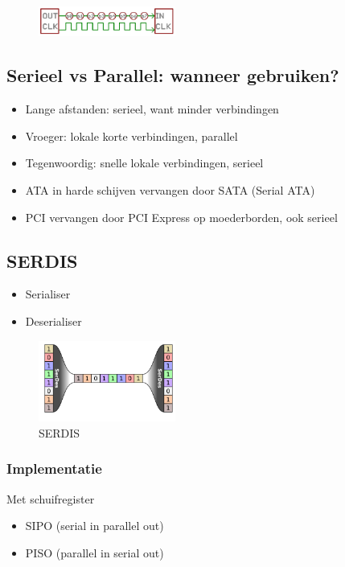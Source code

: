 \documentclass{article}
\begin{document}
\begin{figure}[H]
    \centering
    \includegraphics[width=0.4\textwidth]{Screenshot_20200323_115035.png}
    \caption{}
\end{figure}

\subsection{Serieel vs Parallel: wanneer gebruiken?}
\begin{itemize}
    \item Lange afstanden: serieel, want minder verbindingen
    \item Vroeger: lokale korte verbindingen, parallel
    \item Tegenwoordig: snelle lokale verbindingen, serieel
    \item ATA in harde schijven vervangen door SATA (Serial ATA)
    \item PCI vervangen door PCI Express op moederborden, ook serieel
\end{itemize}

\subsection{SERDIS}
\begin{itemize}
    \item Serialiser
    \item Deserialiser
\end{itemize}

\begin{figure}[H]
    \centering
    \includegraphics[width=0.4\textwidth]{Screenshot_20200323_115743.png}
    \caption{SERDIS}
\end{figure}

\subsubsection{Implementatie}
Met schuifregister
\begin{itemize}
    \item SIPO (serial in parallel out)
    \item PISO (parallel in serial out)
\end{itemize}
\end{document}
